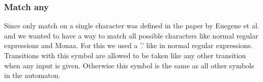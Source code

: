

\subsubsection{Match any}
Since only match on a single character was defined in the paper by Euegene et al. and we wanted to have a way to match all possible characters like normal regular expressions and Monaa. For this we used a '.' like in normal regular expressions. Transitions with this symbol are allowed to be taken like any other transition when any input is given. Otherwise this symbol is the same as all other symbols in the automaton.

